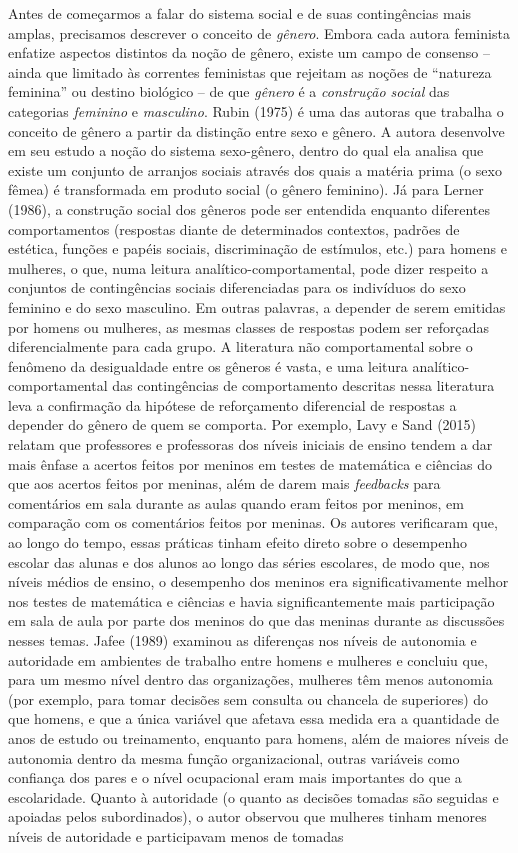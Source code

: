 Antes de começarmos a falar do sistema social e de suas contingências mais amplas, precisamos descrever o conceito de \textit{gênero}. Embora cada autora feminista enfatize aspectos distintos da noção de gênero, existe um campo de consenso – ainda que limitado às correntes feministas que rejeitam as noções de ``natureza feminina'' ou destino biológico – de que \textit{gênero} é a \textit{construção social} das categorias \textit{feminino} e \textit{masculino}. Rubin (1975) é uma das autoras que trabalha o conceito de gênero a partir da distinção entre sexo e gênero. A autora desenvolve em seu estudo a noção do sistema sexo-gênero, dentro do qual ela analisa que existe um conjunto de arranjos sociais através dos quais a matéria prima (o sexo fêmea) é transformada em produto social (o gênero feminino). Já para Lerner (1986), a construção social dos gêneros pode ser entendida enquanto diferentes comportamentos (respostas diante de determinados contextos, padrões de estética, funções e papéis sociais, discriminação de estímulos, etc.) para homens e mulheres, o que, numa leitura analítico-comportamental, pode dizer respeito a conjuntos de contingências sociais diferenciadas para os indivíduos do sexo feminino e do sexo masculino. Em outras palavras, a depender de serem emitidas por homens ou mulheres, as mesmas classes de respostas podem ser reforçadas diferencialmente para cada grupo. A literatura não comportamental sobre o fenômeno da desigualdade entre os gêneros é vasta, e uma leitura analítico-comportamental das contingências de comportamento descritas nessa literatura leva a confirmação da hipótese de reforçamento diferencial de respostas a depender do gênero de quem se comporta. Por exemplo, Lavy e Sand (2015) relatam que professores e professoras dos níveis iniciais de ensino tendem a dar mais ênfase a acertos feitos por meninos em testes de matemática e ciências do que aos acertos feitos por meninas, além de darem mais \textit{feedbacks} para comentários em sala durante as aulas quando eram feitos por meninos, em comparação com os comentários feitos por meninas. Os autores verificaram que, ao longo do tempo, essas práticas tinham efeito direto sobre o desempenho escolar das alunas e dos alunos ao longo das séries escolares, de modo que, nos níveis médios de ensino, o desempenho dos meninos era significativamente melhor nos testes de matemática e ciências e havia significantemente mais participação em sala de aula por parte dos meninos do que das meninas durante as discussões nesses temas. Jafee (1989) examinou as diferenças nos níveis de autonomia e autoridade em ambientes de trabalho entre homens e mulheres e concluiu que, para um mesmo nível dentro das organizações, mulheres têm menos autonomia (por exemplo, para tomar decisões sem consulta ou chancela de superiores) do que homens, e que a única variável que afetava essa medida era a quantidade de anos de estudo ou treinamento, enquanto para homens, além de maiores níveis de autonomia dentro da mesma função organizacional, outras variáveis como confiança dos pares e o nível ocupacional eram mais importantes do que a escolaridade. Quanto à autoridade (o quanto as decisões tomadas são seguidas e apoiadas pelos subordinados), o autor observou que mulheres tinham menores níveis de autoridade e participavam menos de tomadas 